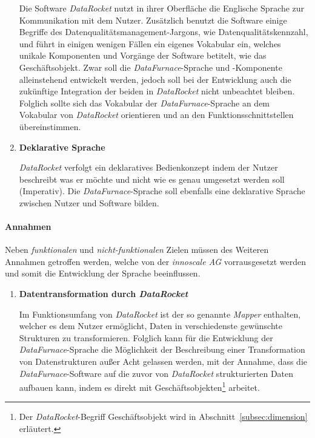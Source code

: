 \documentclass[
  language=german, %
  type=bachelor,%
  ngerman
]{isthesis}
\begin{document}
\begin{content}
\begin{enumerate}
				Die Software \textit{DataRocket} nutzt in ihrer Oberfläche die
				Englische Sprache zur Kommunikation mit dem Nutzer. Zusätzlich benutzt
				die Software einige Begriffe des Datenqualitätsmanagement-Jargons, wie
				\zB{} Datenqualitätskennzahl, und führt in einigen wenigen Fällen ein
				eigenes Vokabular ein, welches unikale Komponenten und Vorgänge der
				Software betitelt, wie \zB{} das Geschäftsobjekt. Zwar soll die
				\textit{DataFurnace}-Sprache und -Komponente alleinstehend entwickelt
				werden, jedoch soll bei der Entwicklung auch die zukünftige Integration
				der beiden in \textit{DataRocket} nicht unbeachtet bleiben. Folglich
				sollte sich das Vokabular der \textit{DataFurnace}-Sprache an dem
				Vokabular von \textit{DataRocket} orientieren und an den
				Funktionsschnittstellen übereinstimmen.

			\item \textbf{Deklarative Sprache}
				
				\textit{DataRocket} verfolgt ein deklaratives Bedienkonzept indem der
				Nutzer beschreibt was er möchte und nicht wie es genau umgesetzt werden
				soll (Imperativ). Die \textit{DataFurnace}-Sprache soll ebenfalls eine
				deklarative Sprache zwischen Nutzer und Software bilden.

    \end{enumerate}

	\paragraph{Annahmen} Neben \textit{funktionalen} und
	\textit{nicht-funktionalen} Zielen müssen des Weiteren Annahmen getroffen
	werden, welche von der \textit{innoscale AG} vorrausgesetzt werden und somit
	die Entwicklung der Sprache beeinflussen.

  \begin{enumerate}
    \item \textbf{Datentransformation durch \textit{DataRocket}}

      Im Funktionsumfang von \textit{DataRocket} ist der so genannte
      \textit{Mapper} enthalten, welcher es dem Nutzer ermöglicht, Daten in
      verschiedenste gewünschte Strukturen zu transformieren. Folglich kann für
      die Entwicklung der \textit{DataFurnace}-Sprache die Möglichkeit der
      Beschreibung einer Transformation von Datenstrukturen außer Acht gelassen
      werden, mit der Annahme, dass die \textit{DataFurnace}-Software auf die
      zuvor von \textit{DataRocket} strukturierten Daten aufbauen kann, indem
      es direkt mit Geschäftsobjekten\footnote{Der \textit{DataRocket}-Begriff
      Geschäftsobjekt wird in Abschnitt~\ref{subsec:dimension} erläutert.}
      arbeitet.


\end{enumerate}
\end{content}
\end{document}
